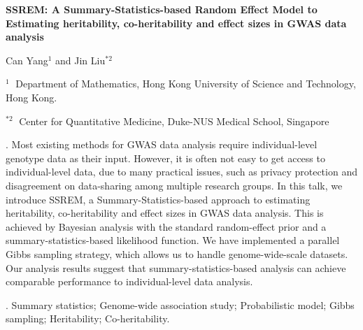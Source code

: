 \documentclass[12pt]{article}
\begin{document}
\begin{flushleft}


{\LARGE\bf SSREM: A Summary-Statistics-based Random Effect Model to Estimating heritability, co-heritability and effect sizes in GWAS data analysis}


\vspace{1.0cm}

Can Yang$^1$ and Jin Liu$^{*2}$

\begin{description}

\item $^1 \;$ Department of Mathematics, Hong Kong University of Science and Technology,
Hong Kong.

\item $^{*2} \;$ Center for Quantitative Medicine,
Duke-NUS Medical School, Singapore

\end{description}

\end{flushleft}


\vspace{0.75cm}

. Most existing methods for GWAS data analysis require individual-level genotype data as their input. However, it is often not easy to get access to individual-level data, due to many practical issues, such as privacy protection and disagreement on data-sharing among multiple research groups. In this talk, we introduce SSREM, a Summary-Statistics-based approach to estimating heritability, co-heritability and effect sizes in GWAS data analysis.  This is achieved by Bayesian analysis with the standard random-effect prior and a summary-statistics-based likelihood function. We have implemented a parallel Gibbs sampling strategy, which allows us to handle genome-wide-scale datasets. Our analysis results suggest that summary-statistics-based analysis can achieve comparable performance to individual-level data analysis.

\vskip 2mm

.
Summary statistics; Genome-wide association study; Probabilistic model; Gibbs
sampling; Heritability; Co-heritability.
\end{document}
